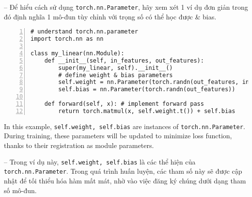 \documentclass{article}
\begin{document}
-- Để hiểu cách sử dụng {\tt torch.nn.Parameter}, hãy xem xét 1 ví dụ đơn giản trong đó định nghĩa 1 mô-đun tùy chỉnh với trọng số có thể học được \& bias.
\begin{Verbatim}[numbers=left,xleftmargin=5mm]
# understand torch.nn.parameter
import torch.nn as nn

class my_linear(nn.Module):
    def __init__(self, in_features, out_features):
        super(my_linear, self).__init__()
        # define weight & bias parameters
        self.weight = nn.Parameter(torch.randn(out_features, in_features))
        self.bias = nn.Parameter(torch.randn(out_features))

    def forward(self, x): # implement forward pass
        return torch.matmul(x, self.weight.t()) + self.bias
\end{Verbatim}
In this example, {\tt self.weight, self.bias} are instances of {\tt torch.nn.Parameter}. During training, these parameters will be updated to minimize loss function, thanks to their registration as module parameters.

-- Trong ví dụ này, {\tt self.weight, self.bias} là các thể hiện của {\tt torch.nn.Parameter}. Trong quá trình huấn luyện, các tham số này sẽ được cập nhật để tối thiểu hóa hàm mất mát, nhờ vào việc đăng ký chúng dưới dạng tham số mô-đun.

\end{document}
